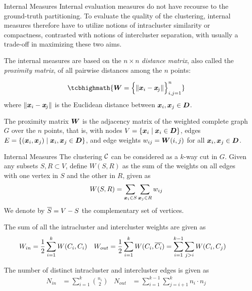 \begin{frame}{Internal Measures}
Internal evaluation measures do not have recourse to the ground-truth
partitioning. To evaluate the
quality of the clustering, internal measures
therefore have to utilize notions of intracluster similarity
or compactness, contrasted with notions of intercluster separation,
with usually a trade-off in maximizing these two aims.

\medskip
The internal measures are based on the $n\times n$ {\em
distance matrix}, also called the {\em proximity matrix}, of all
pairwise distances among the $n$ points:

\begin{align}
    \tcbhighmath{
    \bW = \Bigl\{ \norm{\bx_i- \bx_{\!j}} \Bigr\}_{i,j=1}^n}
  \label{eq:clust:eval:proxW}
\end{align}
where $\left\lVert{\boldsymbol x}_i - {\boldsymbol x}_{\!j}\right\rVert$
is the Euclidean
distance between ${\boldsymbol x}_i, {\boldsymbol x}_{j} \in {\boldsymbol D}$.


\medskip
The proximity matrix ${\boldsymbol W}$ is 
the adjacency matrix of the weighted complete graph $G$ over
the $n$ points, that is, with nodes $V = \{{\boldsymbol x}_i \mid {\boldsymbol x}_i \in {\boldsymbol D}\}$, edges
$E=\{({\boldsymbol x}_i, {\boldsymbol x}_{j})\mid {\boldsymbol x}_i, {\boldsymbol x}_{j} \in {\boldsymbol D}\}$, and edge weights
$w_{ij} = {\boldsymbol W}(i, j)$ for all ${\boldsymbol x}_i, {\boldsymbol x}_{j}\in {\boldsymbol D}$.
\end{frame}

\begin{frame}{Internal Measures}
The clustering ${\mathcal C}$ can be considered as a
$k$-way cut in $G$.
Given any subsets $S,R \subset V$, def\/{i}ne $W(S,R)$ as the sum of the
weights on all edges with one vertex in $S$ and the other in $R$, given
as
\begin{align*}
  W(S, R) = \sum_{{\boldsymbol x}_i \in S} \sum_{{\boldsymbol x}_{j} \in R} w_{ij}
\end{align*}
We denote by $\overline{S} = V - S$ the complementary set
of vertices.

\medskip
The sum of all the intracluster and intercluster 
weights are given as
\begin{align*}
  W_{in} & = \frac{1}{2} \sum_{i=1}^k W(C_i,C_i) &
  W_{out} & = \frac{1}{2} \sum_{i=1}^k W(C_i, \overline{C_i})
  = \sum_{i=1}^{k-1} \sum_{j > i} W(C_i, C_{j})
\end{align*}

The number of distinct intracluster and intercluster edges is given as
\begin{align*}
  N_{in} &= \sum_{i=1}^k {n_i \choose 2} & 
  N_{out} &= \sum_{i=1}^{k-1} \sum_{j=i+1}^k n_i \cdot n_{j} 
\end{align*}
\end{frame}



